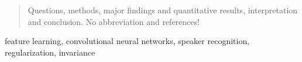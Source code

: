 \begin{abstract}
Questions, methods, major findings and quantitative results, interpretation
and conclusion. No abbreviation and references!

\end{abstract}

\begin{keywords}
feature learning, convolutional neural networks, speaker recognition, regularization, invariance
\end{keywords}